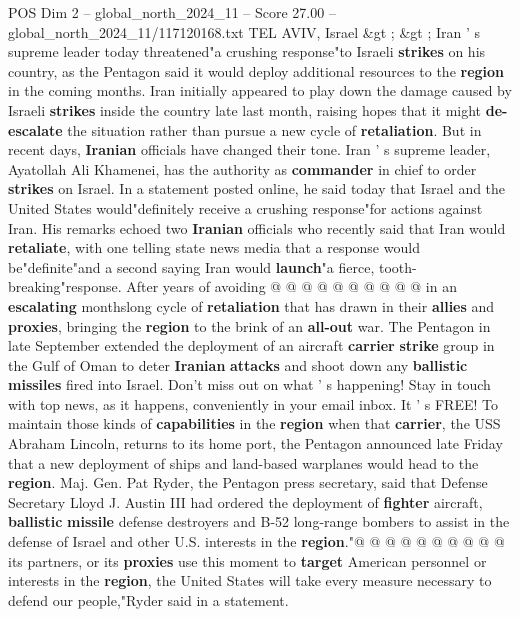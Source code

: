\begin{textsample}{POS Dim 2 – global\_north\_2024\_11 – Score 27.00 – global\_north\_2024\_11/117120168.txt}  \label{ex:f2_pos_252}
TEL AVIV, Israel \&gt ; \&gt ; Iran ' s supreme leader today threatened"a crushing response"to Israeli \textbf{strikes} on his country, as the Pentagon said it would deploy additional resources to the \textbf{region} in the coming months.
Iran initially appeared to play down the damage caused by Israeli \textbf{strikes} inside the country late last month, raising hopes that it might \textbf{de-escalate} the situation rather than pursue a new cycle of \textbf{retaliation}.
But in recent days, \textbf{Iranian} officials have changed their tone.
Iran ' s supreme leader, Ayatollah Ali Khamenei, has the authority as \textbf{commander} in chief to order \textbf{strikes} on Israel.
In a statement posted online, he said today that Israel and the United States would"definitely receive a crushing response"for actions against Iran.
His remarks echoed two \textbf{Iranian} officials who recently said that Iran would \textbf{retaliate}, with one telling state news media that a response would be"definite"and a second saying Iran would \textbf{launch}"a fierce, tooth-breaking"response.
After years of avoiding @ @ @ @ @ @ @ @ @ @ in an \textbf{escalating} monthslong cycle of \textbf{retaliation} that has drawn in their \textbf{allies} and \textbf{proxies}, bringing the \textbf{region} to the brink of an \textbf{all-out} war.
The Pentagon in late September extended the deployment of an aircraft \textbf{carrier} \textbf{strike} group in the Gulf of Oman to deter \textbf{Iranian} \textbf{attacks} and shoot down any \textbf{ballistic} \textbf{missiles} fired into Israel.
Don't miss out on what ' s happening!
Stay in touch with top news, as it happens, conveniently in your email inbox.
It ' s FREE!
To maintain those kinds of \textbf{capabilities} in the \textbf{region} when that \textbf{carrier}, the USS Abraham Lincoln, returns to its home port, the Pentagon announced late Friday that a new deployment of ships and land-based warplanes would head to the \textbf{region}.
Maj.
Gen.
Pat Ryder, the Pentagon press secretary, said that Defense Secretary Lloyd J.
Austin III had ordered the deployment of \textbf{fighter} aircraft, \textbf{ballistic} \textbf{missile} defense destroyers and B-52 long-range bombers to assist in the defense of Israel and other U.S. interests in the \textbf{region}."@ @ @ @ @ @ @ @ @ @ its partners, or its \textbf{proxies} use this moment to \textbf{target} American personnel or interests in the \textbf{region}, the United States will take every measure necessary to defend our people,"Ryder said in a statement.

\end{textsample}
